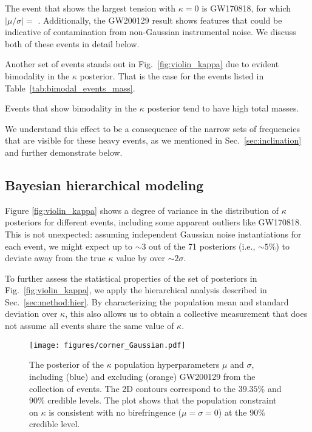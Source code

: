 \documentclass[aps,prd,twocolumn,superscriptaddress,preprintnumbers,floatfix,nofootinbib]{revtex4-2}
\begin{document}
The event that shows the largest tension with $\kappa = 0$ is GW170818, for which $|\mu / \sigma| =$ .
Additionally, the GW200129 result shows features that could be indicative of contamination from non-Gaussian instrumental noise.
We discuss both of these events in detail below.

Another set of events stands out in Fig.~\ref{fig:violin_kappa} due to evident bimodality in the $\kappa$ posterior.
That is the case for the events listed in Table~\ref{tab:bimodal_events_mass}.

\begin{table}
    \caption{Events that show bimodality in the $\kappa$ posterior tend to have high total masses.}
    \begin{ruledtabular}
    \end{ruledtabular}
    \label{tab:bimodal_events_mass}
\end{table}
We understand this effect to be a consequence of the narrow sets of frequencies that are visible for these heavy events, as we mentioned in Sec.~\ref{sec:inclination} and further demonstrate below.

\subsection{Bayesian hierarchical modeling}

Figure \ref{fig:violin_kappa} shows a degree of variance in the distribution of $\kappa$ posteriors for different events, including some apparent outliers like GW170818.
This is not unexpected: assuming independent Gaussian noise instantiations for each event, we might expect up to ${\sim}3$ out of the 71 posteriors (i.e., ${\sim}5\%$) to deviate away from the true $\kappa$ value by over ${\sim}2\sigma$.

To further assess the statistical properties of the set of posteriors in Fig.~\ref{fig:violin_kappa}, we apply the hierarchical analysis described in Sec.~\ref{sec:method:hier}.
By characterizing the population mean and standard deviation over $\kappa$, this also allows us to obtain a collective measurement that does not assume all events share the same value of $\kappa$.

\begin{figure}
    \texttt{[image: figures/corner\_Gaussian.pdf]}
    \caption{
        The posterior of the $\kappa$ population hyperparameters $\mu$ and $\sigma$, including (blue) and excluding (orange) GW200129 from the collection of events.
        The 2D contours correspond to the $39.35\%$ and $90\%$ credible levels.
        The plot shows that the population constraint on $\kappa$ is consistent with no birefringence ($\mu=\sigma=0$) at the 90\% credible level.
    }
    \label{fig:corner_Gaussian}
\end{figure}
\end{document}
